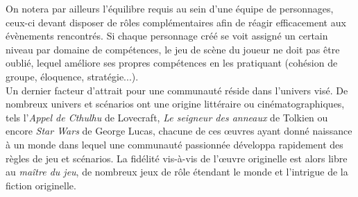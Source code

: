 On notera par ailleurs l'équilibre requis au sein d'une équipe de personnages, ceux-ci devant disposer de rôles complémentaires afin de réagir efficacement aux évènements rencontrés. Si chaque personnage créé se voit assigné un certain niveau par domaine de compétences, le jeu de scène du joueur ne doit pas être oublié, lequel améliore ses propres compétences en les pratiquant (cohésion de groupe, éloquence, stratégie...).\\


Un dernier facteur d'attrait pour une communauté réside dans l'univers visé. De nombreux univers et scénarios ont une origine littéraire ou cinématographiques, tels l'\textit{Appel de Cthulhu} de Lovecraft, \textit{Le seigneur des anneaux} de Tolkien ou encore \textit{Star Wars} de George Lucas, chacune de ces \oe uvres ayant donné naissance à un monde dans lequel une communauté passionnée développa rapidement des règles de jeu et scénarios. La fidélité vis-à-vis de l'\oe uvre originelle est alors libre au \textit{maître du jeu}, de nombreux jeux de rôle étendant le monde et l'intrigue de la fiction originelle.

\clearpage

